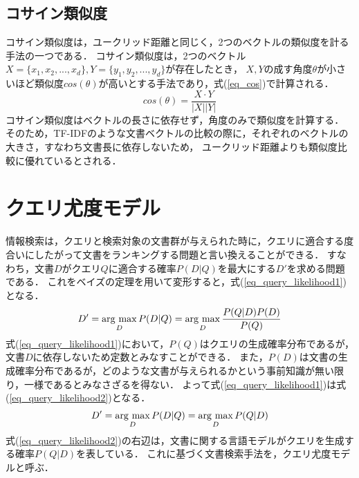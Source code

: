 \subsection{コサイン類似度} \label{sec_cosine}
コサイン類似度は，ユークリッド距離と同じく，2つのベクトルの類似度を計る手法の一つである．
コサイン類似度は，2つのベクトル$X = \{x_1, x_2, ..., x_d\}, Y = \{y_1, y_2, ..., y_d\}$が存在したとき，
$X, Y$の成す角度$\theta$が小さいほど類似度$cos(\theta)$が高いとする手法であり，式(\ref{eq_cos})で計算される．
\begin{equation}
    cos(\theta) = \frac{X \cdot Y}{|X||Y|}  \label{eq_cos}
\end{equation}
コサイン類似度はベクトルの長さに依存せず，角度のみで類似度を計算する．
そのため，TF-IDFのような文書ベクトルの比較の際に，それぞれのベクトルの大きさ，すなわち文書長に依存しないため，
ユークリッド距離よりも類似度比較に優れているとされる．


\section{クエリ尤度モデル}
情報検索は，クエリと検索対象の文書群が与えられた時に，クエリに適合する度合いにしたがって文書をランキングする問題と言い換えることができる．
すなわち，文書$D$がクエリ$Q$に適合する確率$P(D|Q)$を最大にする$D'$を求める問題である．
これをベイズの定理を用いて変形すると，式(\ref{eq_query_likelihood1})となる．
\begin{equation}
    D' = \mathop{\rm arg~max}\limits_{D} P(D|Q) = \mathop{\rm arg~max}\limits_{D} \frac{P(Q|D)P(D)}{P(Q)}    \label{eq_query_likelihood1}
\end{equation}
式(\ref{eq_query_likelihood1})において，$P(Q)$はクエリの生成確率分布であるが，文書$D$に依存しないため定数とみなすことができる．
また，$P(D)$は文書の生成確率分布であるが，どのような文書が与えられるかという事前知識が無い限り，一様であるとみなさざるを得ない．
よって式(\ref{eq_query_likelihood1})は式(\ref{eq_query_likelihood2})となる．
\begin{equation}
    D' = \mathop{\rm arg~max}\limits_{D} P(D|Q) = \mathop{\rm arg~max}\limits_{D} P(Q|D) \label{eq_query_likelihood2}
\end{equation}
式(\ref{eq_query_likelihood2})の右辺は，文書に関する言語モデルがクエリを生成する確率$P(Q|D)$を表している．
これに基づく文書検索手法を，クエリ尤度モデルと呼ぶ．

